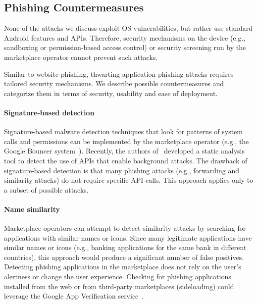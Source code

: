 \subsection{Phishing Countermeasures}

None of the attacks we discuss exploit OS vulnerabilities, but rather use
standard Android features and APIs. Therefore, security mechanisms on the
device (e.g., sandboxing or permission-based access control) or security
screening run by the marketplace operator cannot prevent such attacks.

Similar to website phishing, thwarting application phishing attacks requires tailored security mechanisms. 
We describe possible countermeasures and categorize them in terms of security, usability and ease of deployment.

\paragraph{Signature-based detection} Signature-based malware detection techniques that look for patterns of system calls and permissions can be implemented by the marketplace operator (e.g., the Google Bouncer system~\cite{googlebouncer}).
Recently, the authors of~\cite{bianchi15sp} developed a static analysis tool to detect the use of APIs that enable background attacks.
The drawback of signature-based detection is that many phishing attacks (e.g., forwarding and similarity attacks) do not require specific API calls. This approach applies only to a subset of possible attacks.

\paragraph{Name similarity} Marketplace operators can attempt to detect
similarity attacks by searching for applications with similar names or icons.
Since many legitimate applications have similar names or icons (e.g., banking
applications for the same bank in different countries), this approach would
produce a significant number of false positives. Detecting phishing
applications in the marketplace does not rely on the user's alertness or change
the user experience. Checking for phishing applications installed from the web
or from third-party marketplaces (sideloading) could leverage the Google App
Verification service~\cite{googleappverifiy}.

